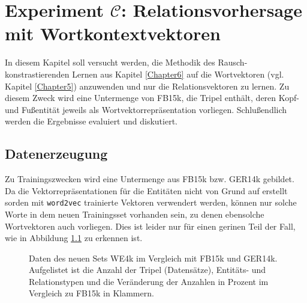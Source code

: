 
\chapter{Experiment $\mathcal{C}$: Relationsvorhersage mit Wortkontextvektoren} %

\label{Chapter8} %


In diesem Kapitel soll versucht werden, die Methodik des Rausch-konstrastierenden Lernen aus Kapitel \ref{Chapter6}
auf die Wortvektoren (vgl. Kapitel \ref{Chapter5}) anzuwenden und nur die Relationsvektoren zu lernen. Zu diesem Zweck
wird eine Untermenge von FB15k, die Tripel enthält, deren Kopf- und Fußentität jeweils als Wortvektorrepräsentation vorliegen.
Schlußendlich werden die Ergebnisse evaluiert und diskutiert.

\section{Datenerzeugung}

Zu Trainingszwecken wird eine Untermenge aus FB15k bzw. GER14k gebildet. Da
die Vektorrepräsentationen für die Entitäten nicht von Grund auf erstellt sorden mit
\verb|word2vec| trainierte Vektoren verwendert werden, können nur solche Worte in dem
neuen Trainingsset vorhanden sein, zu denen ebensolche Wortvektoren auch vorliegen.
Dies ist leider nur für einen gerinen Teil der Fall, wie in Abbildung \ref{fig:we4k} zu
erkennen ist.

\begin{figure}[h]
  \centering
  \begin{changemargin}{0cm}{0cm}
\end{changemargin}
  \caption[Daten des neuen Relationsdatensets im Vergleich zu \textsc{FB15k} und \textsc{GER14k}]{Daten des neuen Sets WE4k im Vergleich mit
  FB15k und GER14k. Aufgelistet ist die Anzahl der Tripel (Datensätze), Entitäts- und Relationstypen und die Veränderung
  der Anzahlen in Prozent im Vergleich zu FB15k in Klammern.\label{fig:we4k}}
\end{figure}

